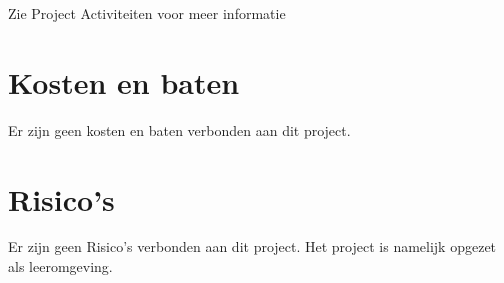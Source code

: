 \documentclass[]{report}
\begin{document}
Zie Project Activiteiten voor meer informatie




\chapter{Kosten en baten}

Er zijn geen kosten en baten verbonden aan dit project.



\chapter{Risico’s}

Er zijn geen Risico's verbonden aan dit project. Het project is namelijk opgezet als leeromgeving.
\end{document}
